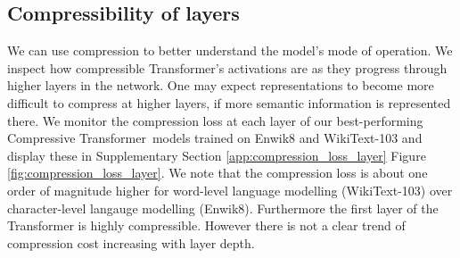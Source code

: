 \documentclass{article} \usepackage{iclr2020_conference,times}
\newcommand{\model}{Compressive Transformer}
\begin{document}
\subsection{Compressibility of layers}
We can use compression to better understand the model's mode of operation. We inspect how compressible Transformer's activations are as they progress through higher layers in the network. One may expect representations to become more difficult to compress at higher layers, if more semantic information is represented there. We monitor the compression loss at each layer of our best-performing \model~models trained on Enwik8 and WikiText-103 and display these in Supplementary Section \ref{app:compression_loss_layer} Figure \ref{fig:compression_loss_layer}. We note that the compression loss is about one order of magnitude higher for word-level language modelling (WikiText-103) over character-level langauge modelling (Enwik8). Furthermore the first layer of the Transformer is highly compressible. However there is not a clear trend of compression cost increasing with layer depth.
\vspace{-0.5em}
\end{document}
